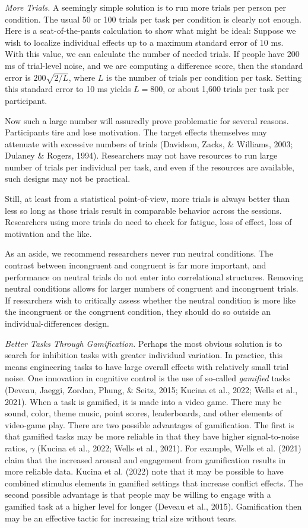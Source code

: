 \documentclass[
  ,man]{apa6}
\begin{document}
\emph{More Trials.} A seemingly simple solution is to run more trials per person per condition. The usual 50 or 100 trials per task per condition is clearly not enough. Here is a seat-of-the-pants calculation to show what might be ideal: Suppose we wish to localize individual effects up to a maximum standard error of 10 ms. With this value, we can calculate the number of needed trials. If people have 200 ms of trial-level noise, and we are computing a difference score, then the standard error is \(200\sqrt{2/L}\), where \(L\) is the number of trials per condition per task. Setting this standard error to 10 ms yields \(L=800\), or about 1,600 trials per task per participant.

Now such a large number will assuredly prove problematic for several reasons. Participants tire and lose motivation. The target effects themselves may attenuate with excessive numbers of trials (Davidson, Zacks, \& Williams, 2003; Dulaney \& Rogers, 1994). Researchers may not have resources to run large number of trials per individual per task, and even if the resources are available, such designs may not be practical.

Still, at least from a statistical point-of-view, more trials is always better than less so long as those trials result in comparable behavior across the sessions. Researchers using more trials do need to check for fatigue, loss of effect, loss of motivation and the like.

As an aside, we recommend researchers never run neutral conditions. The contrast between incongruent and congruent is far more important, and performance on neutral trials do not enter into correlational structures. Removing neutral conditions allows for larger numbers of congruent and incongruent trials. If researchers wish to critically assess whether the neutral condition is more like the incongruent or the congruent condition, they should do so outside an individual-differences design.

\emph{Better Tasks Through Gamification.} Perhaps the most obvious solution is to search for inhibition tasks with greater individual variation. In practice, this means engineering tasks to have large overall effects with relatively small trial noise. One innovation in cognitive control is the use of so-called \emph{gamified} tasks (Deveau, Jaeggi, Zordan, Phung, \& Seitz, 2015; Kucina et al., 2022; Wells et al., 2021). When a task is gamified, it is made into a video game. There may be sound, color, theme music, point scores, leaderboards, and other elements of video-game play. There are two possible advantages of gamification. The first is that gamified tasks may be more reliable in that they have higher signal-to-noise ratios, \(\gamma\) (Kucina et al., 2022; Wells et al., 2021). For example, Wells et al. (2021) claim that the increased arousal and engagement from gamification results in more reliable data. Kucina et al. (2022) note that it may be possible to have combined stimulus elements in gamified settings that increase conflict effects. The second possible advantage is that people may be willing to engage with a gamified task at a higher level for longer (Deveau et al., 2015). Gamification then may be an effective tactic for increasing trial size without tears.
\end{document}
